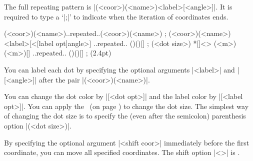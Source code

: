 The full repeating pattern is |(<coor>)(<name>){<label>}[<angle>]|.
It is required to type a  `|;|' to indicate when the iteration of coordinates ends. 

\begin{tzdef}
\tzcoors*(<coor>)(<name>)..repeated..(<coor>)(<name>) ;
(<coor>)(<name>){<label>}[<[label opt]angle>] 
                                ..repeated.. ()(){}[] ; (<dot size>)
 *[]<> (<m>)(<m>){}[] ..repeated.. ()(){}[] ; (2.4pt)
\end{tzdef}

You can label each dot by specifying the optional arguments |{<label>}| and |[<angle>]| after the pair |(<coor>)(<name>)|.

\begin{tzcode}{.3}
{}
\end{tzcode}

You can change the dot color by |[<dot opt>]| and the label color by |[<label opt>]|.
You can apply the \threeways\ (on page \pageref{ss:threeways}) to change the dot size. The simplest way of changing the dot size is to specify the  (even after the semicolon) parenthesis option |(<dot size>)|. 

\begin{tzcode}{.3}
{}
\end{tzcode}

By specifying the optional argument |<shift coor>| immediately before the first coordinate, you can move all specified coordinates.
The  shift option |<>| is .

\begin{tzcode}{.3}
\end{tzcode}


